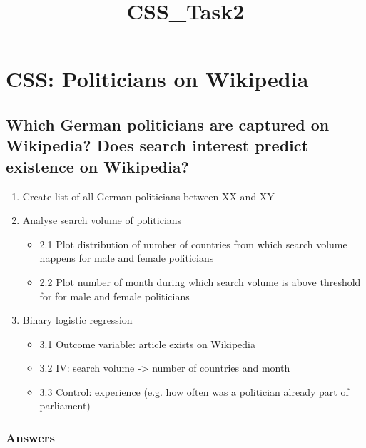 \documentclass[11pt]{article}
\title{CSS\_Task2}
\providecommand{\tightlist}{%
      \setlength{\itemsep}{0pt}\setlength{\parskip}{0pt}}
\begin{document}
    
    
    \maketitle
    
    

    
    \section{CSS: Politicians on
Wikipedia}\label{css-politicians-on-wikipedia}

\subsection{Which German politicians are captured on Wikipedia? Does
search interest predict existence on
Wikipedia?}\label{which-german-politicians-are-captured-on-wikipedia-does-search-interest-predict-existence-on-wikipedia}

\begin{enumerate}
\def\labelenumi{\arabic{enumi}.}
\tightlist
\item
  Create list of all German politicians between XX and XY
\item
  Analyse search volume of politicians

  \begin{itemize}
  \tightlist
  \item
    2.1 Plot distribution of number of countries from which search
    volume happens for male and female politicians
  \item
    2.2 Plot number of month during which search volume is above
    threshold for for male and female politicians
  \end{itemize}
\item
  Binary logistic regression

  \begin{itemize}
  \tightlist
  \item
    3.1 Outcome variable: article exists on Wikipedia
  \item
    3.2 IV: search volume -\textgreater{} number of countries and month
  \item
    3.3 Control: experience (e.g. how often was a politician already
    part of parliament)
  \end{itemize}
\end{enumerate}

\subsubsection{Answers}\label{answers}
\end{document}
